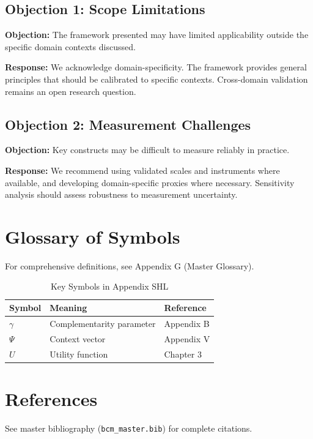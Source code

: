 \subsection{Objection 1: Scope Limitations}

\textbf{Objection:} The framework presented may have limited applicability
outside the specific domain contexts discussed.

\textbf{Response:} We acknowledge domain-specificity. The framework provides
general principles that should be calibrated to specific contexts. Cross-domain
validation remains an open research question.

\subsection{Objection 2: Measurement Challenges}

\textbf{Objection:} Key constructs may be difficult to measure reliably in
practice.

\textbf{Response:} We recommend using validated scales and instruments where
available, and developing domain-specific proxies where necessary. Sensitivity
analysis should assess robustness to measurement uncertainty.



\section{Glossary of Symbols}
\label{sec:shl-glossary}

For comprehensive definitions, see Appendix G (Master Glossary).

\begin{table}[htbp]
\centering
\caption{Key Symbols in Appendix SHL}
\begin{tabular}{lll}
\toprule
\textbf{Symbol} & \textbf{Meaning} & \textbf{Reference} \\
\midrule
$\gamma$ & Complementarity parameter & Appendix B \\
$\Psi$ & Context vector & Appendix V \\
$U$ & Utility function & Chapter 3 \\
\bottomrule
\end{tabular}
\end{table}


\section{References}
\label{sec:shl-references}

See master bibliography (\texttt{bcm\_master.bib}) for complete citations.

\nocite{bcm_master}

